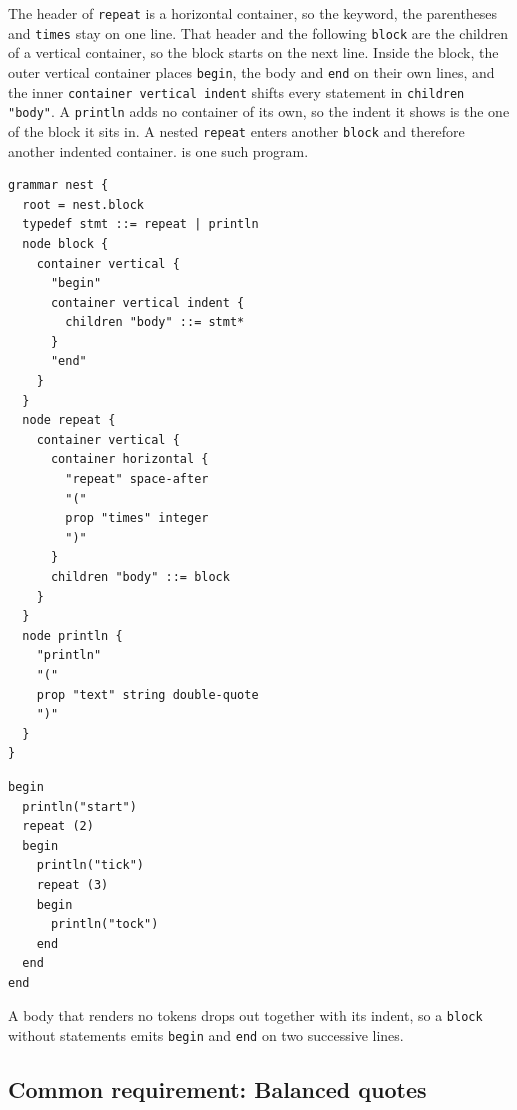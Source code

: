 \documentclass[]{report}
\begin{document}
 The header of \texttt{repeat} is a horizontal container, so the keyword, the parentheses and \texttt{times} stay on one line. That header and the following \texttt{block} are the children of a vertical container, so the block starts on the next line. Inside the block, the outer vertical container places \texttt{begin}, the body and \texttt{end} on their own lines, and the inner \texttt{container vertical indent} shifts every statement in \texttt{children "body"}. A \texttt{println} adds no container of its own, so the indent it shows is the one of the block it sits in. A nested \texttt{repeat} enters another \texttt{block} and therefore another indented container.  is one such program.
\begin{listing}[p]
\begin{verbatim}
grammar nest {
  root = nest.block
  typedef stmt ::= repeat | println
  node block {
    container vertical {
      "begin"
      container vertical indent {
        children "body" ::= stmt*
      }
      "end"
    }
  }
  node repeat {
    container vertical {
      container horizontal {
        "repeat" space-after
        "("
        prop "times" integer
        ")"
      }
      children "body" ::= block
    }
  }
  node println {
    "println"
    "("
    prop "text" string double-quote
    ")"
  }
}
\end{verbatim}
\caption{Nested indentation: \texttt{repeat} is followed by a \texttt{block}, \texttt{println} is a single line inside that block}
\label{lst:grammar-indent-nested}
\end{listing}

\begin{listing}[p]
\begin{verbatim}
begin
  println("start")
  repeat (2)
  begin
    println("tick")
    repeat (3)
    begin
      println("tock")
    end
  end
end
\end{verbatim}
\caption{A \texttt{block} of statements rendered from \cref{lst:grammar-indent-nested}. Each entered \texttt{block} adds one level.}
\label{lst:grammar-indent-nested-result}
\end{listing}

A body that renders no tokens drops out together with its indent, so a \texttt{block} without statements emits \texttt{begin} and \texttt{end} on two successive lines.

\subsection{Common requirement: Balanced quotes}
\end{document}
